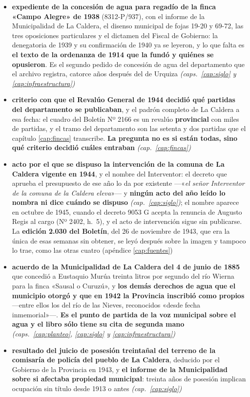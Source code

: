 \begin{itemize}[leftmargin=*]
\item \textbf{expediente de la concesión de agua para regadío de la finca «Campo Alegre» de 1938} (8312-P/937), con el informe de la Municipalidad de La Caldera, el disenso municipal de fojas 19-20 y 69-72, las tres oposiciones particulares y el dictamen del Fiscal de Gobierno: la denegatoria de 1939 y su confirmación de 1940 ya se leyeron, y lo que falta es \textbf{el texto de la ordenanza de 1914 que la fundó y quiénes se opusieron}. Es el segundo pedido de concesión de agua del departamento que el archivo registra, catorce años después del de Urquiza \textit{(caps.\ \ref{cap:siglo} y \ref{cap:infraestructura})}
\item \textbf{criterio con que el Revalúo General de 1944 decidió qué partidas del departamento se publicaban}, y el padrón completo de La Caldera a esa fecha: el cuadro del Boletín Nº 2166 es un revalúo \textbf{provincial} con miles de partidas, y el tramo del departamento son las setenta y dos partidas que el capítulo \ref{cap:fincas} transcribe. \textbf{La pregunta no es si están todas, sino qué criterio decidió cuáles entraban} \textit{(cap.\ \ref{cap:fincas})}
\item \textbf{acto por el que se dispuso la intervención de la comuna de La Caldera vigente en 1944}, y el nombre del Interventor: el decreto que aprueba el presupuesto de ese año lo da por existente ---«\textit{el señor Interventor de la comuna de la Caldera eleva}»--- y \textbf{ningún acto del año leído lo nombra ni dice cuándo se dispuso} \textit{(cap.\ \ref{cap:siglo})}; el nombre aparece en octubre de 1945, cuando el decreto 9053 G acepta la renuncia de Augusto Regis al cargo (Nº 2402, h.\ 5), y el acto de intervención sigue sin publicarse. La \textbf{edición 2.030 del Boletín}, del 26 de noviembre de 1943, que era la única de esas semanas sin obtener, se leyó después sobre la imagen y tampoco lo trae, como las otras cuatro (apéndice \ref{cap:fuentes})
\item \textbf{acuerdo de la Municipalidad de La Caldera del 4 de junio de 1885} que concedió a Eustaquio Murúa treinta litros por segundo del río Wierna para la finca «Sausal o Curuzú», y \textbf{los demás derechos de agua que el municipio otorgó y que en 1942 la Provincia inscribió como propios} ---entre ellos los del río de las Nieves, reconocidos «desde fecha inmemorial»---. \textbf{Es el punto de partida de la voz municipal sobre el agua y el libro sólo tiene su cita de segunda mano} \textit{(caps.\ \ref{cap:planteo}, \ref{cap:siglo} y \ref{cap:infraestructura})}
\item \textbf{resultado del juicio de posesión treintañal del terreno de la comisaría de policía del pueblo de La Caldera}, deducido por el Gobierno de la Provincia en 1943, y \textbf{el informe de la Municipalidad sobre si afectaba propiedad municipal}: treinta años de posesión implican ocupación sin título desde 1913 o antes \textit{(cap.\ \ref{cap:siglo})}

\end{itemize}
